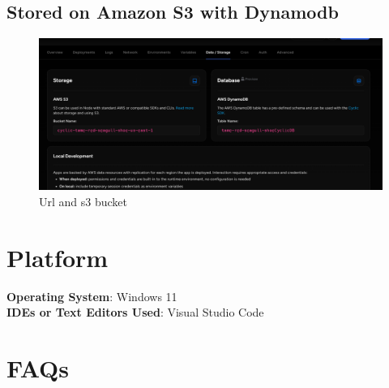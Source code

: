 \documentclass[11pt]{article}
\begin{document}
\subsection{Stored on Amazon S3 with Dynamodb}
\begin{figure}[H]
    \centering
    \includegraphics[width=.95\textwidth]{data.png}
    \caption{Url and s3 bucket}
\end{figure}

\section{Platform}
\textbf{Operating System}: Windows 11 \\
\textbf{IDEs or Text Editors Used}: Visual Studio Code\\

% 

\section{FAQs}
\end{document}
